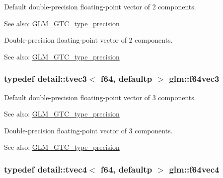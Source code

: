 Default double-precision floating-point vector of 2 components. \begin{Desc}
\item[See also:]\hyperlink{group__gtc__type__precision}{GLM\_\-GTC\_\-type\_\-precision}\end{Desc}
Double-precision floating-point vector of 2 components. \begin{Desc}
\item[See also:]\hyperlink{group__gtc__type__precision}{GLM\_\-GTC\_\-type\_\-precision} \end{Desc}
\hypertarget{group__gtc__type__precision_g794ee8f0a105cda01946cd9860f492a8}{
\subsubsection[f64vec3]{\setlength{\rightskip}{0pt plus 5cm}typedef detail::tvec3$<$ f64, defaultp $>$ {\bf glm::f64vec3}}}
\label{group__gtc__type__precision_g794ee8f0a105cda01946cd9860f492a8}


Default double-precision floating-point vector of 3 components. \begin{Desc}
\item[See also:]\hyperlink{group__gtc__type__precision}{GLM\_\-GTC\_\-type\_\-precision}\end{Desc}
Double-precision floating-point vector of 3 components. \begin{Desc}
\item[See also:]\hyperlink{group__gtc__type__precision}{GLM\_\-GTC\_\-type\_\-precision} \end{Desc}
\hypertarget{group__gtc__type__precision_gc10d088c5f1d16a62fb019408af34e1b}{
\subsubsection[f64vec4]{\setlength{\rightskip}{0pt plus 5cm}typedef detail::tvec4$<$ f64, defaultp $>$ {\bf glm::f64vec4}}}
\label{group__gtc__type__precision_gc10d088c5f1d16a62fb019408af34e1b}



